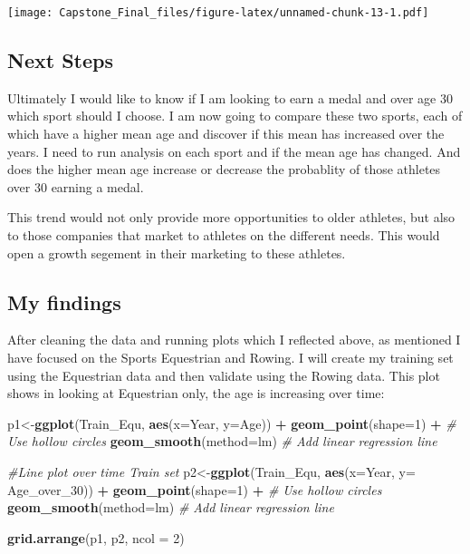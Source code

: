 \documentclass[]{article}
\newenvironment{Shaded}{\begin{snugshade}}{\end{snugshade}}
\newcommand{\KeywordTok}[1]{\textcolor[rgb]{0.13,0.29,0.53}{\textbf{#1}}}
\newcommand{\DataTypeTok}[1]{\textcolor[rgb]{0.13,0.29,0.53}{#1}}
\newcommand{\DecValTok}[1]{\textcolor[rgb]{0.00,0.00,0.81}{#1}}
\newcommand{\StringTok}[1]{\textcolor[rgb]{0.31,0.60,0.02}{#1}}
\newcommand{\CommentTok}[1]{\textcolor[rgb]{0.56,0.35,0.01}{\textit{#1}}}
\newcommand{\OperatorTok}[1]{\textcolor[rgb]{0.81,0.36,0.00}{\textbf{#1}}}
\newcommand{\NormalTok}[1]{#1}
\begin{document}
\texttt{[image: Capstone\_Final\_files/figure-latex/unnamed-chunk-13-1.pdf]}

\subsection{Next Steps}\label{next-steps}

Ultimately I would like to know if I am looking to earn a medal and over
age 30 which sport should I choose. I am now going to compare these two
sports, each of which have a higher mean age and discover if this mean
has increased over the years. I need to run analysis on each sport and
if the mean age has changed. And does the higher mean age increase or
decrease the probablity of those athletes over 30 earning a medal.

This trend would not only provide more opportunities to older athletes,
but also to those companies that market to athletes on the different
needs. This would open a growth segement in their marketing to these
athletes.

\subsection{My findings}\label{my-findings}

After cleaning the data and running plots which I reflected above, as
mentioned I have focused on the Sports Equestrian and Rowing. I will
create my training set using the Equestrian data and then validate using
the Rowing data. This plot shows in looking at Equestrian only, the age
is increasing over time:

\begin{Shaded}
\begin{Highlighting}[]
\NormalTok{p1<-}\KeywordTok{ggplot}\NormalTok{(Train_Equ, }\KeywordTok{aes}\NormalTok{(}\DataTypeTok{x=}\NormalTok{Year, }\DataTypeTok{y=}\NormalTok{Age)) }\OperatorTok{+}
\StringTok{  }\KeywordTok{geom_point}\NormalTok{(}\DataTypeTok{shape=}\DecValTok{1}\NormalTok{) }\OperatorTok{+}\StringTok{    }\CommentTok{# Use hollow circles}
\StringTok{  }\KeywordTok{geom_smooth}\NormalTok{(}\DataTypeTok{method=}\NormalTok{lm)    }\CommentTok{# Add linear regression line }

\CommentTok{#Line plot over time Train set}
\NormalTok{p2<-}\KeywordTok{ggplot}\NormalTok{(Train_Equ, }\KeywordTok{aes}\NormalTok{(}\DataTypeTok{x=}\NormalTok{Year, }\DataTypeTok{y=}\NormalTok{ Age_over_}\DecValTok{30}\NormalTok{)) }\OperatorTok{+}
\StringTok{  }\KeywordTok{geom_point}\NormalTok{(}\DataTypeTok{shape=}\DecValTok{1}\NormalTok{) }\OperatorTok{+}\StringTok{    }\CommentTok{# Use hollow circles}
\StringTok{  }\KeywordTok{geom_smooth}\NormalTok{(}\DataTypeTok{method=}\NormalTok{lm)    }\CommentTok{# Add linear regression line}

\KeywordTok{grid.arrange}\NormalTok{(p1, p2, }\DataTypeTok{ncol =} \DecValTok{2}\NormalTok{)}
\end{Highlighting}
\end{Shaded}
\end{document}
